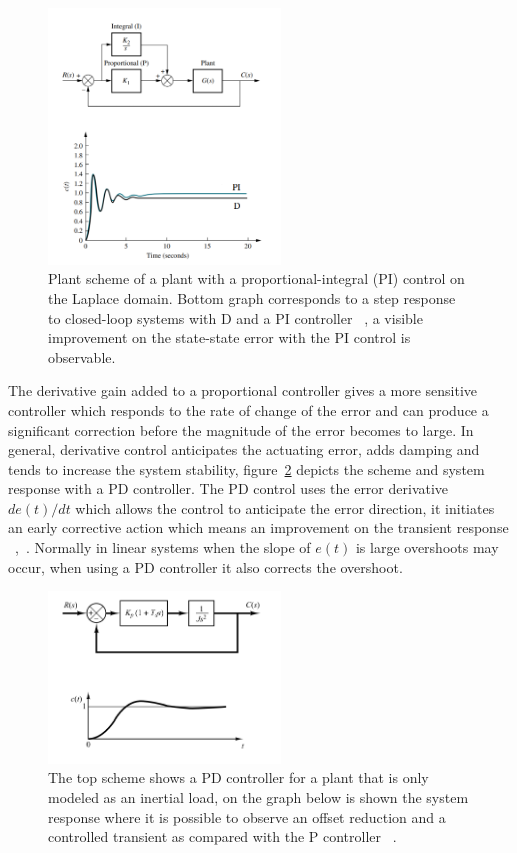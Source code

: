 \begin{figure}[h]
	\centering
	\includegraphics[width=0.55\textwidth]{Chp2/PI_Dcomp.png}
	\caption{  Plant scheme of   a plant with  a proportional-integral (PI) control   on the Laplace domain. Bottom graph corresponds to a step response to closed-loop systems with D and a PI controller ~\cite[Chapter~ 9]{Nise}, a visible improvement on the state-state error with the PI control is observable.  \label{PI}}
\end{figure}

The derivative gain added to a proportional controller gives a more sensitive controller which responds to the rate of change of the error and can produce a significant correction before the magnitude of the error becomes to large. In general, derivative control anticipates the actuating error, adds damping  and tends to increase the system stability, figure~\ref{propderGain} depicts the scheme and system response with a PD controller. The PD control uses the error derivative ~$de(t)/dt$ which allows the control to anticipate the error direction, it initiates an early corrective action which means an improvement on the transient response   ~\cite[Chapter ~9]{Golnaraghi2010},~\cite[Chapter ~9]{Nise}. Normally in linear systems when the slope of $e(t)$ is large overshoots may occur, when using a PD controller it also corrects the overshoot. 
\smallskip

\begin{figure}[h]
	\centering
	\includegraphics[width=0.55\textwidth]{Chp2/propderivgain.png}
	\caption{ The top scheme shows a PD controller for a  plant that is only modeled as an inertial load, on the graph below is shown the system response where it is possible to observe an offset reduction and a controlled transient as compared with the P controller ~\cite[Chapter~ 5]{Ogata2009}. \label{propderGain}}
\end{figure}

